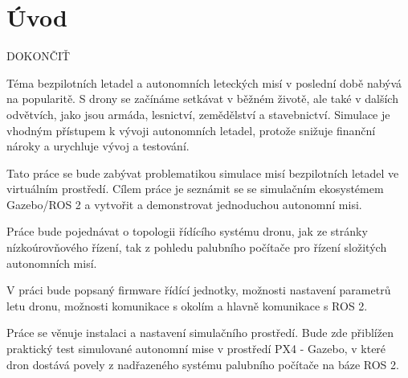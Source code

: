 \chapter*{Úvod}
{}

DOKONČIŤ

Téma bezpilotních letadel a autonomních leteckých misí v poslední době nabývá na popularitě. S drony se začínáme setkávat v běžném životě, ale také v dalších odvětvích, jako jsou armáda, lesnictví, zemědělství a stavebnictví. Simulace je vhodným přístupem k vývoji autonomních letadel, protože snižuje finanční nároky a urychluje vývoj a testování.

Tato práce se bude zabývat problematikou simulace misí bezpilotních letadel ve virtuálním prostředí. Cílem práce je seznámit se se simulačním ekosystémem Gazebo/ROS 2 a vytvořit a demonstrovat jednoduchou autonomní misi.

Práce bude pojednávat o topologii řídícího systému dronu, jak ze stránky nízkoúrovňového řízení, tak z pohledu palubního počítače pro řízení složitých autonomních misí.

V práci bude popsaný firmware řídící jednotky, možnosti nastavení parametrů letu dronu, možnosti komunikace s okolím a hlavně komunikace s ROS 2.

Práce se věnuje instalaci a nastavení simulačního prostředí. Bude zde přiblížen praktický test simulované autonomní mise v prostředí PX4 - Gazebo, v které dron dostává povely z nadřazeného systému palubního počítače na báze ROS 2.